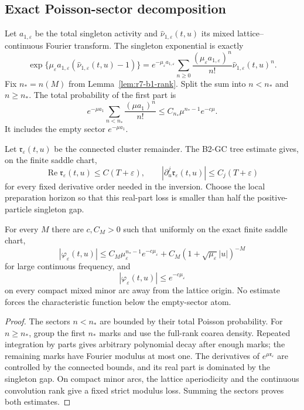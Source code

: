 \subsection{Exact Poisson-sector decomposition}

Let $a_{1,\varepsilon}$ be the total singleton activity and
$\widehat\nu_{1,\varepsilon}(t,u)$ its mixed lattice--continuous Fourier
transform.  The singleton exponential is exactly
\[
 \exp\{\mu_\varepsilon a_{1,\varepsilon}
       (\widehat\nu_{1,\varepsilon}(t,u)-1)\}
 =e^{-\mu_\varepsilon a_{1,\varepsilon}}
  \sum_{n\ge0}\frac{(\mu_\varepsilon a_{1,\varepsilon})^n}{n!}
  \widehat\nu_{1,\varepsilon}(t,u)^n.
\]
Fix $n_*=n(M)$ from Lemma~\ref{lem:r7-b1-rank}.  Split the sum into
$n<n_*$ and $n\ge n_*$.  The total probability of the first part is
\[
 e^{-\mu a_1}\sum_{n<n_*}\frac{(\mu a_1)^n}{n!}
 \le C_{n_*}\mu^{n_*-1}e^{-c\mu}.
\]
It includes the empty sector $e^{-\mu a_1}$.

Let $\mathfrak r_\varepsilon(t,u)$ be the connected cluster remainder.  The
B2-GC tree estimate gives, on the finite saddle chart,
\[
 \operatorname{Re}\mathfrak r_\varepsilon(t,u)
 \le C(T+\varepsilon),
 \qquad
 |\partial_u^j\mathfrak r_\varepsilon(t,u)|\le C_j(T+\varepsilon)
\]
for every fixed derivative order needed in the inversion.  Choose the local
preparation horizon so that this real-part loss is smaller than half the
positive-particle singleton gap.

\begin{theorem}
\label{thm:r7-b1-characteristic}
For every $M$ there are $c,C_M>0$ such that uniformly on the exact finite saddle
chart,
\[
 |\varphi_\varepsilon(t,u)|
 \le C_M\mu_\varepsilon^{n_*-1}e^{-c\mu_\varepsilon}
 +C_M(1+\sqrt{\mu_\varepsilon}|u|)^{-M}
\]
for large continuous frequency, and
\[
 |\varphi_\varepsilon(t,u)|\le e^{-c\mu_\varepsilon}
\]
on every compact mixed minor arc away from the lattice origin.  No estimate
forces the characteristic function below the empty-sector atom.
\end{theorem}

\begin{proof}
The sectors $n<n_*$ are bounded by their total Poisson probability.  For
$n\ge n_*$, group the first $n_*$ marks and use the full-rank coarea density.
Repeated integration by parts gives arbitrary polynomial decay after enough
marks; the remaining marks have Fourier modulus at most one.  The derivatives
of $e^{\mu\mathfrak r_\varepsilon}$ are controlled by the connected bounds,
and its real part is dominated by the singleton gap.  On compact minor arcs,
the lattice aperiodicity and the continuous convolution rank give a fixed
strict modulus loss.  Summing the sectors proves both estimates.
\end{proof}

